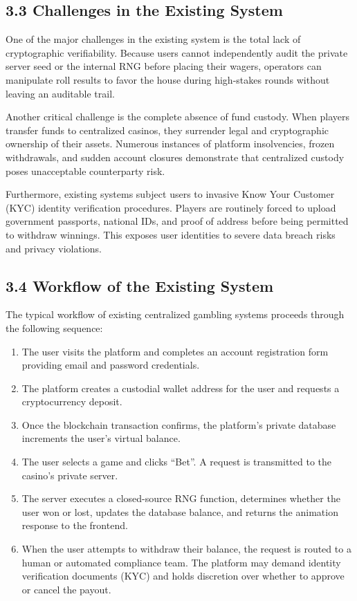 \subsection*{3.3 Challenges in the Existing System}
One of the major challenges in the existing system is the total lack of cryptographic verifiability. Because users cannot independently audit the private server seed or the internal RNG before placing their wagers, operators can manipulate roll results to favor the house during high-stakes rounds without leaving an auditable trail.

Another critical challenge is the complete absence of fund custody. When players transfer funds to centralized casinos, they surrender legal and cryptographic ownership of their assets. Numerous instances of platform insolvencies, frozen withdrawals, and sudden account closures demonstrate that centralized custody poses unacceptable counterparty risk.

Furthermore, existing systems subject users to invasive Know Your Customer (KYC) identity verification procedures. Players are routinely forced to upload government passports, national IDs, and proof of address before being permitted to withdraw winnings. This exposes user identities to severe data breach risks and privacy violations.

\subsection*{3.4 Workflow of the Existing System}
The typical workflow of existing centralized gambling systems proceeds through the following sequence:
\begin{enumerate}[leftmargin=1.5em]
    \item The user visits the platform and completes an account registration form providing email and password credentials.
    \item The platform creates a custodial wallet address for the user and requests a cryptocurrency deposit.
    \item Once the blockchain transaction confirms, the platform's private database increments the user's virtual balance.
    \item The user selects a game and clicks ``Bet''. A request is transmitted to the casino's private server.
    \item The server executes a closed-source RNG function, determines whether the user won or lost, updates the database balance, and returns the animation response to the frontend.
    \item When the user attempts to withdraw their balance, the request is routed to a human or automated compliance team. The platform may demand identity verification documents (KYC) and holds discretion over whether to approve or cancel the payout.
\end{enumerate}


